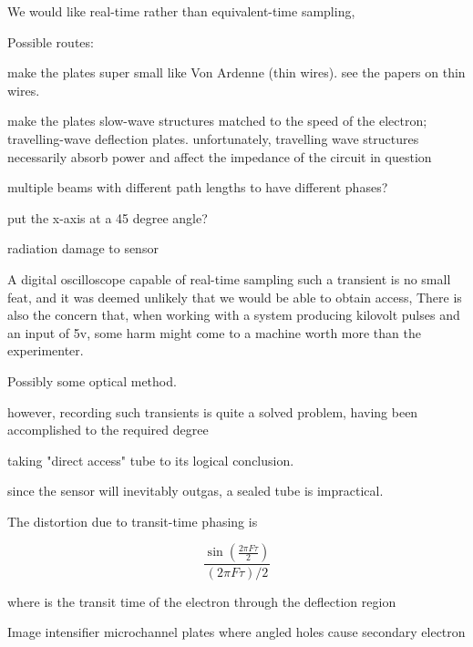 

We would like real-time rather than equivalent-time sampling, 


Possible routes:

make the plates super small like Von Ardenne (thin wires). see the papers on thin wires.

make the plates slow-wave structures matched to the speed of the electron; travelling-wave deflection plates.
unfortunately, travelling wave structures necessarily absorb power and affect the impedance of the circuit in question


multiple beams with different path lengths to have different phases?

put the x-axis at a 45 degree angle?


radiation damage to sensor 

A digital oscilloscope capable of real-time sampling such a transient is no small feat, and it was deemed unlikely that we would be 
able to obtain access, There is also the concern that, when working with a system producing kilovolt 
pulses and an input of 5v, some harm might come to a machine worth more than the experimenter.

Possibly some optical method. 

however, recording such transients is quite a solved problem, having been accomplished to the required degree 

taking "direct access" tube to its logical conclusion.

since the sensor will inevitably outgas, a sealed tube is impractical.


The distortion due to transit-time phasing is

$$ \frac{\sin(\frac{2\pi F \tau}{2})}{(2\pi F \tau)/2} $$

where \tau is the transit time of the electron through the deflection region 

Image intensifier microchannel plates where angled holes cause secondary electron 

